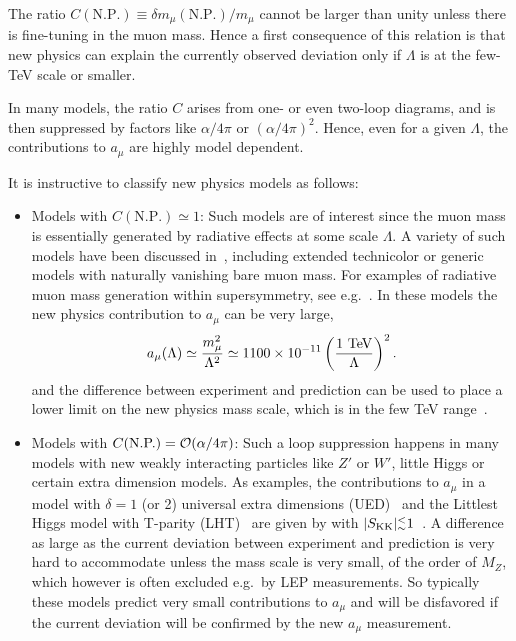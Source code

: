 The ratio $C(\mbox{N.P.})\equiv\delta m_\mu(\mbox{N.P.})/{m_\mu}$
cannot be larger than unity unless there is fine-tuning in the muon
mass. Hence a first consequence of this relation is that new physics
can explain the currently observed deviation %
only if
$\Lambda$ is at the few-TeV scale or smaller.

In many models, the ratio $C$ arises from one- or even two-loop
diagrams, and is then suppressed by factors like  $\alpha/4\pi$ or
$(\alpha/4\pi)^2$. Hence, even for a given $\Lambda$, the
contributions to $a_\mu$ are highly model dependent.

It is instructive to classify new physics models as follows:
\begin{itemize}
\item Models with $C(\mbox{N.P.})\simeq1$: Such models are of interest
  since the muon
  mass is essentially generated by radiative effects  at some
scale $\Lambda$.
A variety of such models  have been discussed in~\cite{czmar}, including
extended technicolor or generic models with naturally vanishing bare
muon mass. For examples of radiative muon mass generation within
supersymmetry, see e.g.\ 
\cite{Borzumati:1999sp,Crivellin:2010ty}.  In these models the
new physics contribution to $a_\mu$ can be very large, 
\begin{equation} 
a_{\mu}
(\Lambda) \simeq {m^2_{\mu} \over \Lambda^2}\simeq
1100\times10^{-11}\left(\frac{1\mbox{ TeV}}{\Lambda}\right)^2. 
\end{equation}
and the difference between experiment and prediction can  be used to place a lower
limit on the new physics mass scale, which is in the few TeV
range~\cite{elp,Crivellin:2010ty}.
\item Models with $C(\mbox{N.P.})={\cal O}(\alpha/4\pi)$:
Such a loop suppression happens in many models with new weakly
interacting particles like $Z'$ or $W'$, little Higgs or certain extra
dimension models.  As examples, the contributions to $a_\mu$ in a
model with $\delta=1$ (or
2) universal extra dimensions (UED)~\cite{AppelqDob} and the Littlest Higgs
model with T-parity (LHT)~\cite{Blanke:2007db} are given by
 with $|S_{\rm KK}| _{\sim}^{<}1$~\cite{AppelqDob}.
A difference as large as
the current deviation between experiment and prediction is very hard to accommodate unless the mass scale
is very small, of the order of $M_Z$, which however is often excluded
e.g.\ by LEP measurements.
So typically these models predict very small contributions to $a_\mu$
and will be disfavored if the current deviation will be confirmed by
the new $a_\mu$ measurement.


\end{itemize}
